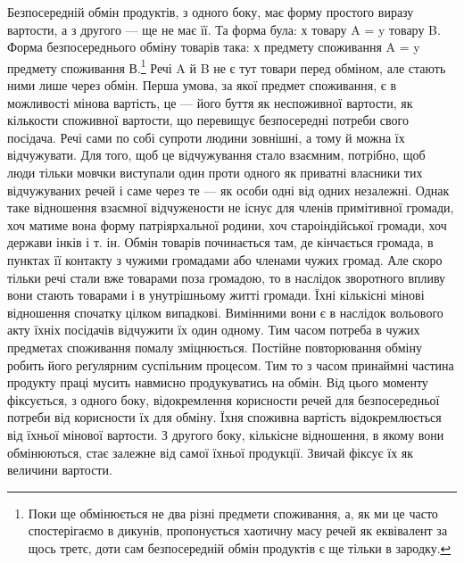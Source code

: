 Безпосередній обмін продуктів, з одного боку, має форму
простого виразу вартости, а з другого — ще не має її. Та форма
була: х товару A = y товару B. Форма безпосереднього обміну
товарів така: х предмету споживання A = y предмету споживання
В.\footnote{
Поки ще обмінюється не два різні предмети споживання, а, як
ми це часто спостерігаємо в дикунів, пропонується хаотичну масу речей
як еквівалент за щось третє, доти сам безпосередній обмін продуктів є
ще тільки в зародку.
} Речі A й B не є тут товари перед обміном, але стають ними
лише через обмін. Перша умова, за якої предмет споживання,
є в можливості мінова вартість, це — його буття як неспоживної
вартости, як кількости споживної вартости, що перевищує
безпосередні потреби свого посідача. Речі сами по собі супроти
людини зовнішні, а тому й можна їх відчужувати. Для того,
щоб це відчужування стало взаємним, потрібно, щоб люди тільки
мовчки виступали один проти одного як приватні власники тих
відчужуваних речей і саме через те — як особи одні від одних
незалежні. Однак таке відношення взаємної відчужености не
існує для членів примітивної громади, хоч матиме вона форму
патріярхальної родини, хоч староіндійської громади, хоч держави
інків і т. ін. Обмін товарів починається там, де кінчається
громада, в пунктах її контакту з чужими громадами або членами
чужих громад. Але скоро тільки речі стали вже товарами поза
громадою, то в наслідок зворотного впливу вони стають товарами
і в унутрішньому житті громади. Їхні кількісні мінові відношення
спочатку цілком випадкові. Вимінними вони є в наслідок
вольового акту їхніх посідачів відчужити їх один одному. Тим часом
потреба в чужих предметах споживання помалу зміцнюється.
Постійне повторювання обміну робить його реґулярним
суспільним процесом. Тим то з часом принаймні частина продукту
праці мусить навмисно продукуватись на обмін. Від цього моменту
фіксується, з одного боку, відокремлення корисности речей
для безпосередньої потреби від корисности їх для обміну. Їхня
споживна вартість відокремлюється від їхньої мінової вартости.
З другого боку, кількісне відношення, в якому вони обмінюються,
стає залежне від самої їхньої продукції. Звичай фіксує їх як
величини вартости.

